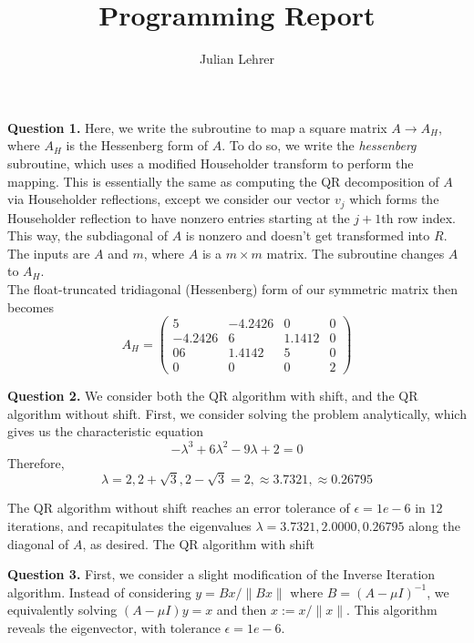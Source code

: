 \documentclass{article}
\title{Programming Report}
\date{}
\author{Julian Lehrer}
\newcommand{\ra}{\longrightarrow}
\begin{document}
\maketitle
\textbf{Question 1.} Here, we write the subroutine to map a square matrix $A \ra A_H$, where $A_H$ is the Hessenberg form of $A$. To do so, we write the \textit{hessenberg} subroutine, which uses a modified Householder transform to perform the mapping. This is essentially the same as computing the QR decomposition of $A$ via Householder reflections, except we consider our vector $v_j$ which forms the Householder reflection to have nonzero entries starting at the $j+1$th row index. This way, the subdiagonal of $A$ is nonzero and doesn't get transformed into $R$. The inputs are $A$ and $m$, where $A$ is a $m \times m$ matrix. The subroutine changes $A$ to $A_H$.\\

The float-truncated tridiagonal (Hessenberg) form of our symmetric matrix then becomes 
\begin{equation*}
    A_H=\begin{pmatrix}
        5&-4.2426& 0 & 0 \\
        -4.2426&6&1.1412& 0 \\
        06&1.4142&5&0\\
        0&0&0&2    
    \end{pmatrix}
\end{equation*}

\textbf{Question 2.} We consider both the QR algorithm with shift, and the QR algorithm without shift. First, we consider solving the problem analytically, which gives us the characteristic equation 
\begin{equation*}
    -\lambda^3 +6\lambda^2 -9\lambda + 2=0
\end{equation*}
Therefore, 
\begin{equation*}
    \lambda = 2, 2+\sqrt{3}, 2-\sqrt{3} = 2, \approx 3.7321, \approx 0.26795
\end{equation*}

The QR algorithm without shift reaches an error tolerance of $\epsilon = 1e-6$ in $12$ iterations, and recapitulates the eigenvalues $\lambda = 3.7321, 2.0000, 0.26795$ along the diagonal of $A$, as desired. The QR algorithm with shift 

\textbf{Question 3.} First, we consider a slight modification of the Inverse Iteration algorithm. Instead of considering $y = Bx/\|Bx\|$ where $B=(A-\mu I)^{-1}$, we equivalently solving $(A-\mu I)y = x$ and then $x := x/\|x\|$. This algorithm reveals the eigenvector, with tolerance $\epsilon = 1e-6$. 
\end{document}
